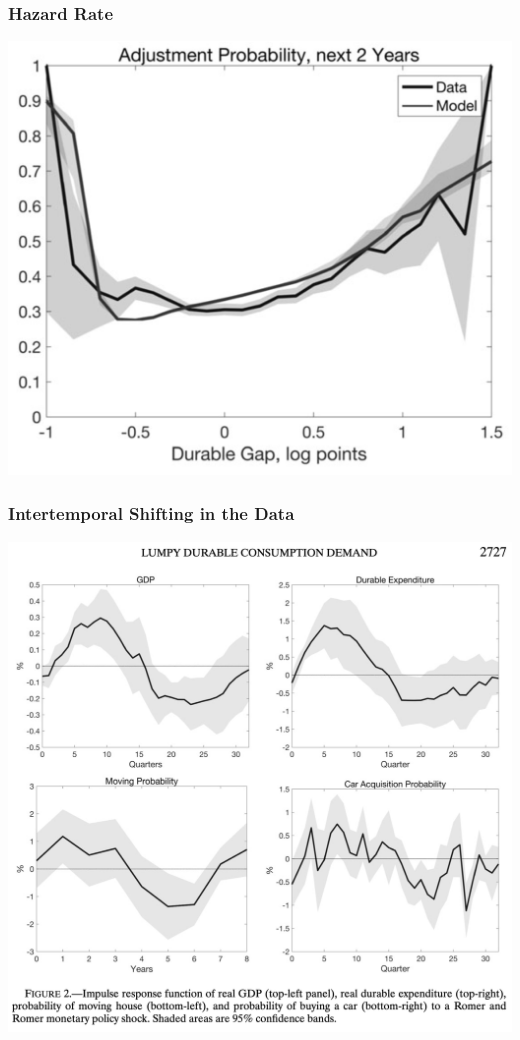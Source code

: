 \documentclass[english,xcolor=svgnames]{beamer}
\begin{document}
\begin{frame}
    \frametitle{Hazard Rate}
    \begin{center}
    	\includegraphics[scale=0.3]{figures/MWFIG1.png}	
    \end{center}
\end{frame}

\begin{frame}
    \frametitle{Intertemporal Shifting in the Data}
    \begin{center}
    	\includegraphics[scale=0.2]{figures/MWFIG2.png}	
    \end{center}
\end{frame}
\end{document}
